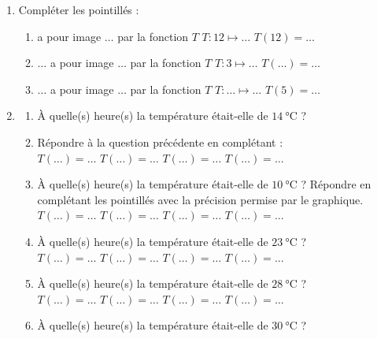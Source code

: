 \documentclass[main.tex]{subfiles}
\begin{document}
\begin{example}
\begin{enumerate}
		
		\item Compléter les pointillés :
		\begin{enumerate}[label=\textbullet]
			\item {} a pour image $\ldots$ par la fonction $T$ \fg{} \og $T\colon 12 \mapsto \ldots $ \fg{} \og $T(12)=\ldots$\fg{}
			\item \og $\ldots$ a pour image $\ldots$ par la fonction $T$ \fg{} \og $T\colon 3 \mapsto \ldots $ \fg{} \og $T(\ldots)=\ldots$\fg{}
			\item \og $\ldots$ a pour image $\ldots$ par la fonction $T$ \fg{} \og $T\colon \ldots \mapsto \ldots $ \fg{} \og $T(5)=\ldots$\fg{}
		\end{enumerate}
		\item \begin{enumerate}
			\item À quelle(s) heure(s) la température était-elle de $\SI{14}{\celsius}$ ? \dotfill 
			\item Répondre à la question précédente en complétant :\\
			$T(\ldots)=\ldots$ \hfill $T(\ldots)=\ldots$ \hfill $T(\ldots)=\ldots$ \hfill \null $T(\ldots)=\ldots$ \hfill \null
			\item À quelle(s) heure(s) la température était-elle de $\SI{10}{\celsius}$ ? Répondre en complétant les pointillés avec la précision permise par le graphique.\\
			$T(\ldots)=\ldots$ \hfill $T(\ldots)=\ldots$ \hfill $T(\ldots)=\ldots$ \hfill \null $T(\ldots)=\ldots$ \hfill \null
			\item  À quelle(s) heure(s) la température était-elle de $\SI{23}{\celsius}$ ? \\
			$T(\ldots)=\ldots$ \hfill $T(\ldots)=\ldots$ \hfill $T(\ldots)=\ldots$ \hfill \null $T(\ldots)=\ldots$ \hfill \null
			\item  À quelle(s) heure(s) la température était-elle de $\SI{28}{\celsius}$ ? \\
			$T(\ldots)=\ldots$ \hfill $T(\ldots)=\ldots$ \hfill $T(\ldots)=\ldots$ \hfill \null $T(\ldots)=\ldots$ \hfill \null
			\item  À quelle(s) heure(s) la température était-elle de $\SI{30}{\celsius}$ ? \\

\end{enumerate}
\end{enumerate}
\end{example}
\end{document}
